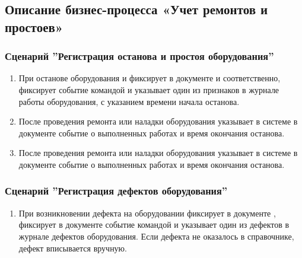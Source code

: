 \subsection{Описание бизнес-процесса «Учет ремонтов и простоев»}
\label{bp:maintance}




\subsubsection{Сценарий ''Регистрация останова и простоя оборудования''}
\label{bp:maintance_1}

\begin{enumerate}
\item	%
При останове оборудования \gaoperator и \operator  фиксирует в документе  и  соответственно, фиксирует событие командой   и указывает один из признаков в журнале работы оборудования, с указанием времени начала останова. 
\item	После проведения ремонта или наладки оборудования \gaoperator указывает в системе \gofro в документе    событие о выполненных работах и время окончания останова.
\item	После проведения ремонта или наладки оборудования \operator указывает в системе \gofro в документе  событие о выполненных работах и время окончания останова.

\end{enumerate}





\subsubsection{Сценарий ''Регистрация дефектов оборудования''}
\label{bp:maintance_2}

\begin{enumerate}
\item	При возникновении дефекта на  оборудовании \gaoperator фиксирует в документе , \operator фиксирует в документе  событие командой   и указывает один из дефектов в журнале дефектов оборудования. Если дефекта не оказалось в справочнике, дефект вписывается вручную. 

\end{enumerate}